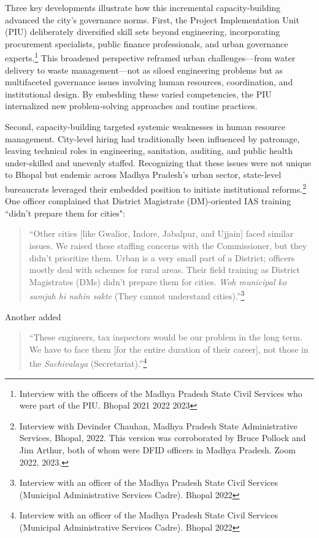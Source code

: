 Three key developments illustrate how this incremental capacity-building advanced the city’s governance norms. First, the Project Implementation Unit (PIU) deliberately diversified skill sets beyond engineering, incorporating procurement specialists, public finance professionals, and urban governance experts.\footnote{Interview with the officers of the Madhya Pradesh State Civil Services who were part of the PIU. Bhopal 2021 2022 2023} This broadened perspective reframed urban challenges—from water delivery to waste management—not as siloed engineering problems but as multifaceted governance issues involving human resources, coordination, and institutional design. By embedding these varied competencies, the PIU internalized new problem-solving approaches and routine practices. 

Second, capacity-building targeted systemic weaknesses in human resource management. City-level hiring had traditionally been influenced by patronage, leaving technical roles in engineering, sanitation, auditing, and public health under-skilled and unevenly staffed. Recognizing that these issues were not unique to Bhopal but endemic across Madhya Pradesh’s urban sector, state-level bureaucrats leveraged their embedded position to initiate institutional reforms.\footnote{Interview with Devinder Chauhan, Madhya Pradesh State Administrative Services, Bhopal, 2022. This version was corroborated by Bruce Pollock and Jim Arthur, both of whom were DFID officers in Madhya Pradesh. Zoom 2022, 2023.
} One officer complained that District Magistrate (DM)-oriented IAS training “didn’t prepare them for cities":

\begin{quote}
    “Other cities [like Gwalior, Indore, Jabalpur, and Ujjain] faced similar issues. We raised these staffing concerns with the Commissioner, but they didn’t prioritize them. Urban is a very small part of a District; officers mostly deal with schemes for rural areas. Their field training as District Magistrates (DMs) didn’t prepare them for cities.  \textit{Woh municipal ko samjah hi nahin sakte} (They cannot understand cities).”\footnote{Interview with an officer of the Madhya Pradesh State Civil Services (Municipal Administrative Services Cadre).
Bhopal 2022}
\end{quote}

Another added 

 \begin{quote}
“These engineers, tax inspectors would be our problem in the long term. We have to face them [for the entire duration of their career], not those in the \textit{Sachivalaya} (Secretariat).”\footnote{Interview with an officer of the Madhya Pradesh State Civil Services (Municipal Administrative Services Cadre).
Bhopal 2022}

 \end{quote}

